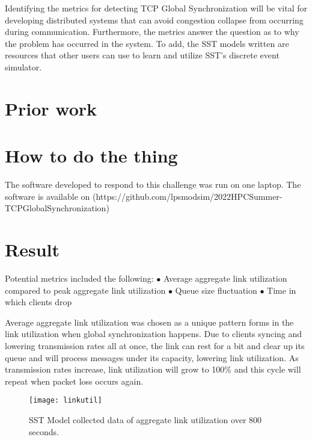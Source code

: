 \documentclass{article}
\begin{document}
Identifying the metrics for detecting TCP Global Synchronization will be vital for developing distributed systems that can avoid congestion collapse from occurring during communication. Furthermore, the metrics answer the question as to why the problem has occurred in the system. To add, the SST models written are resources that other users can use to learn and utilize SST's discrete event simulator.

\section{Prior work} %



\section{How to do the thing}

The software developed to respond to this challenge was run on one laptop.
The software is available on (https://github.com/lpsmodsim/2022HPCSummer-TCPGlobalSynchronization)

\section{Result} %

Potential metrics included the following:\newline
	$\bullet$ Average aggregate link utilization compared to peak aggregate link utilization \newline
	$\bullet$ Queue size fluctuation \newline
	$\bullet$ Time in which clients drop \newline\newline

	Average aggregate link utilization was chosen as a unique pattern forms in the link utilization when global synchronization happens. Due to clients syncing and lowering transmission rates all at once, the link can rest for a bit and clear up its queue and will process messages under its capacity, lowering link utilization. As transmission rates increase, link utilization will grow to 100\% and this cycle will repeat when packet loss occurs again.\newline
	
	\begin{figure}[H]
	\centering
	\texttt{[image: linkutil]}
	\caption{SST Model collected data of aggregate link utilization over 800 seconds.}
	\end{figure}
	
\end{document}
